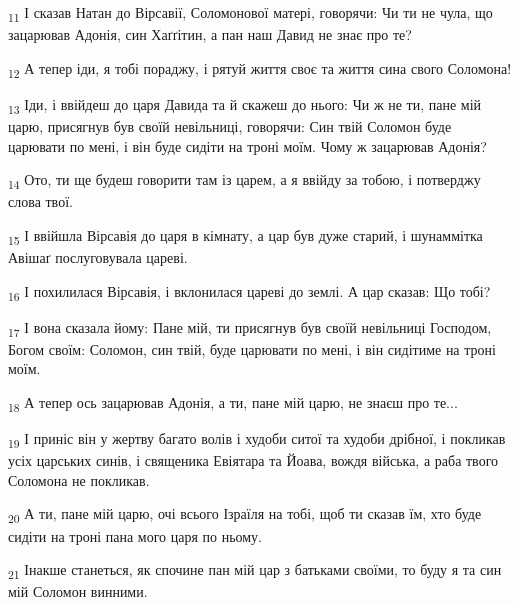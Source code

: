 \begin{tcolorbox}
\textsubscript{11} І сказав Натан до Вірсавії, Соломонової матері, говорячи: Чи ти не чула, що зацарював Адонія, син Хаґґітин, а пан наш Давид не знає про те?
\end{tcolorbox}
\begin{tcolorbox}
\textsubscript{12} А тепер іди, я тобі пораджу, і рятуй життя своє та життя сина свого Соломона!
\end{tcolorbox}
\begin{tcolorbox}
\textsubscript{13} Іди, і ввійдеш до царя Давида та й скажеш до нього: Чи ж не ти, пане мій царю, присягнув був своїй невільниці, говорячи: Син твій Соломон буде царювати по мені, і він буде сидіти на троні моїм. Чому ж зацарював Адонія?
\end{tcolorbox}
\begin{tcolorbox}
\textsubscript{14} Ото, ти ще будеш говорити там із царем, а я ввійду за тобою, і потверджу слова твої.
\end{tcolorbox}
\begin{tcolorbox}
\textsubscript{15} І ввійшла Вірсавія до царя в кімнату, а цар був дуже старий, і шунаммітка Авішаґ послуговувала цареві.
\end{tcolorbox}
\begin{tcolorbox}
\textsubscript{16} І похилилася Вірсавія, і вклонилася цареві до землі. А цар сказав: Що тобі?
\end{tcolorbox}
\begin{tcolorbox}
\textsubscript{17} І вона сказала йому: Пане мій, ти присягнув був своїй невільниці Господом, Богом своїм: Соломон, син твій, буде царювати по мені, і він сидітиме на троні моїм.
\end{tcolorbox}
\begin{tcolorbox}
\textsubscript{18} А тепер ось зацарював Адонія, а ти, пане мій царю, не знаєш про те...
\end{tcolorbox}
\begin{tcolorbox}
\textsubscript{19} І приніс він у жертву багато волів і худоби ситої та худоби дрібної, і покликав усіх царських синів, і священика Евіятара та Йоава, вождя війська, а раба твого Соломона не покликав.
\end{tcolorbox}
\begin{tcolorbox}
\textsubscript{20} А ти, пане мій царю, очі всього Ізраїля на тобі, щоб ти сказав їм, хто буде сидіти на троні пана мого царя по ньому.
\end{tcolorbox}
\begin{tcolorbox}
\textsubscript{21} Інакше станеться, як спочине пан мій цар з батьками своїми, то буду я та син мій Соломон винними.
\end{tcolorbox}
